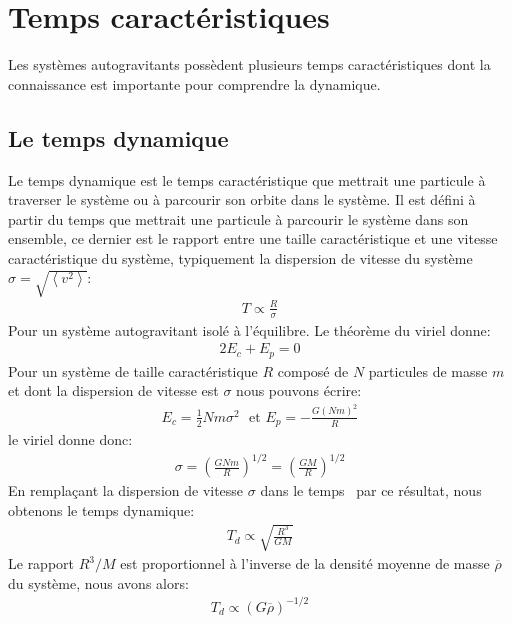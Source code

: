 \section{Temps caractéristiques\label{chap_trelax}}

Les systèmes autogravitants possèdent plusieurs temps caractéristiques dont la connaissance est importante pour comprendre la dynamique.

\subsection{Le temps dynamique}

Le temps dynamique est le temps caractéristique que mettrait une particule à traverser le système ou à parcourir son orbite dans le système. Il est
défini à partir du temps que mettrait une particule à parcourir le système dans son ensemble, ce dernier est le rapport entre une taille
caractéristique et une vitesse caractéristique du système, typiquement la dispersion de vitesse du système $\sigma=\sqrt{\left\langle
v^2\right\rangle}$:
\begin{align}
	T\propto\frac{R}{\sigma} \label{Eq::TempsCarac::Tcr}
\end{align}
Pour un système autogravitant isolé à l'équilibre. Le théorème du viriel donne:
\begin{align*}
	2E_{c}+E_{p}=0
\end{align*}
Pour un système de taille caractéristique $R$ composé de $N$ particules de masse $m$ et dont la dispersion de vitesse est $\sigma$ nous pouvons écrire:
\begin{align*}
	E_{c}=\frac{1}{2}Nm\sigma^{2}\ \ \ \text{et\ \ \ }E_{p}=-\frac{G\left(Nm\right)^{2}}{R}%
\end{align*}
le viriel donne donc:
\begin{align*}
	\sigma=\left(  \frac{GNm}{R}\right)  ^{1/2}=\left(  \frac{GM}{R}\right) ^{1/2}%
\end{align*}
En remplaçant la dispersion de vitesse $\sigma$ dans le temps~ par ce résultat, nous obtenons le temps dynamique:
\begin{align*}
	T_{d}\propto\sqrt{\frac{R^{3}}{GM}}%
\end{align*}
Le rapport $R^{3}/M$ est proportionnel à l'inverse de la densité moyenne de masse $\overline{\rho}$ du système, nous avons alors:
\begin{align}
	T_{d}\propto\left(  G\overline{\rho}\right)  ^{-1/2} \label{def:T-dyn_tcr} %
\end{align}

